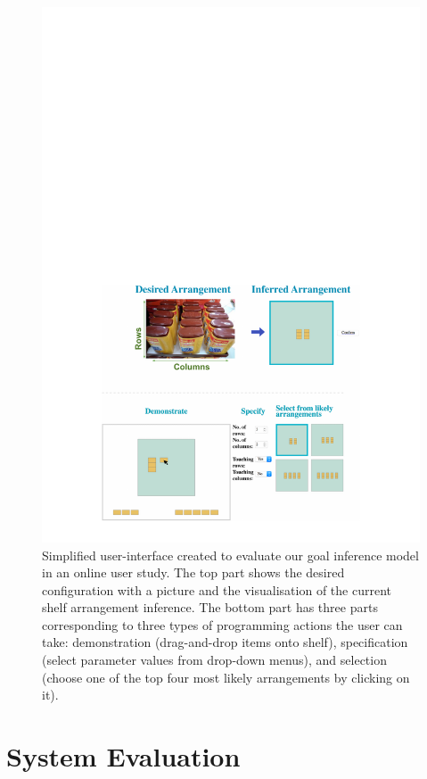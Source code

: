 \begin{figure}
	\includegraphics[width=\linewidth]{figures/amt-gui}
	\caption{Simplified user-interface created to evaluate our goal inference model in an online user study. The top part shows the desired configuration with a picture and the visualisation of the current shelf arrangement inference. The bottom part has three parts corresponding to three types of programming actions the user can take: demonstration (drag-and-drop items onto shelf), specification (select parameter values from drop-down menus), and selection (choose one of the top four most likely arrangements by clicking on it).}
	\label{fig:amt-gui}
\end{figure}

\section{System Evaluation}\label{sec:irossystemeval}

